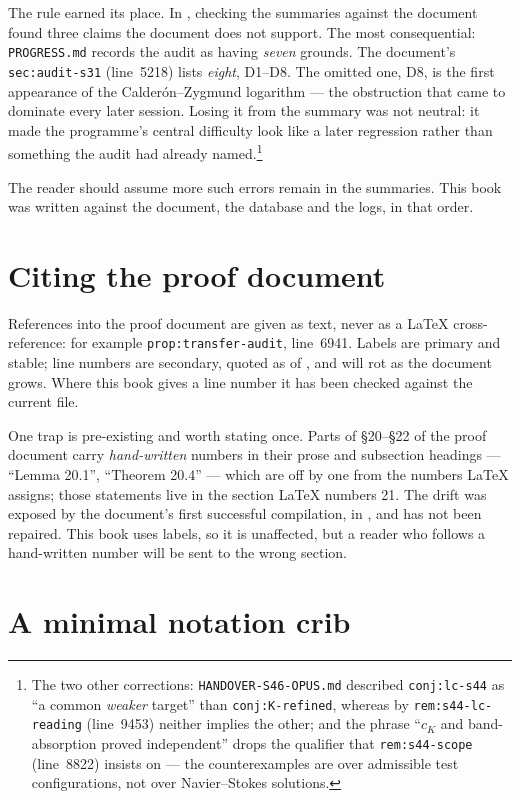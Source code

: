 The rule earned its place. In , checking the summaries against the
document found three claims the document does not support. The most
consequential: \texttt{PROGRESS.md} records the  audit as having
\emph{seven} grounds. The document's \texttt{sec:audit-s31} (line~5218) lists
\emph{eight}, D1--D8. The omitted one, D8, is the first appearance of the
Calder\'on--Zygmund logarithm --- the obstruction that came to dominate every
later session. Losing it from the summary was not neutral: it made the
programme's central difficulty look like a later regression rather than
something the audit had already named.\footnote{The two other 
corrections: \texttt{HANDOVER-S46-OPUS.md} described
\texttt{conj:lc-s44} as ``a common \emph{weaker} target'' than
\texttt{conj:K-refined}, whereas by \texttt{rem:s44-lc-reading} (line~9453)
neither implies the other; and the phrase ``\(c_K\) and band-absorption
proved independent'' drops the qualifier that \texttt{rem:s44-scope}
(line~8822) insists on --- the counterexamples are over admissible test
configurations, not over Navier--Stokes solutions.}

The reader should assume more such errors remain in the summaries. This book
was written against the document, the database and the logs, in that order.

\section{Citing the proof document}
\label{sec:citing}

References into the proof document are given as text, never as a \LaTeX{}
cross-reference: for example \texttt{prop:transfer-audit}, line~6941. Labels
are primary and stable; line numbers are secondary, quoted as of , and
will rot as the document grows. Where this book gives a line number it has
been checked against the current file.

One trap is pre-existing and worth stating once. Parts of \S20--\S22 of the
proof document carry \emph{hand-written} numbers in their prose and
subsection headings --- ``Lemma 20.1'', ``Theorem 20.4'' --- which are off by
one from the numbers \LaTeX{} assigns; those statements live in the section
\LaTeX{} numbers 21. The drift was exposed by the document's first successful
compilation, in , and has not been repaired. This book uses labels, so
it is unaffected, but a reader who follows a hand-written number will be sent
to the wrong section.

\section{A minimal notation crib}
\label{sec:crib}

